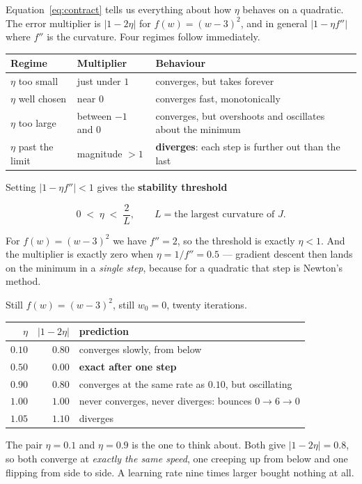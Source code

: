 \documentclass[11pt]{article}
\begin{document}
Equation~\eqref{eq:contract} tells us everything about how $\eta$ behaves on a
quadratic. The error multiplier is $\lvert 1 - 2\eta\rvert$ for
$f(w) = (w-3)^2$, and in general $\lvert 1 - \eta f''\rvert$ where $f''$ is the
curvature. Four regimes follow immediately.

\begin{center}
\begin{tabular}{@{}llp{7.6cm}@{}}
\toprule
\textbf{Regime} & \textbf{Multiplier} & \textbf{Behaviour}\\
\midrule
$\eta$ too small     & just under $1$ & converges, but takes forever\\[3pt]
$\eta$ well chosen   & near $0$       & converges fast, monotonically\\[3pt]
$\eta$ too large     & between $-1$ and $0$ & converges, but overshoots and
  oscillates about the minimum\\[3pt]
$\eta$ past the limit & magnitude $> 1$ & \textbf{diverges}: each step is
  further out than the last\\
\bottomrule
\end{tabular}
\end{center}

Setting $\lvert 1 - \eta f''\rvert < 1$ gives the \textbf{stability threshold}

\begin{equation}
  \label{eq:stab}
  0 \;<\; \eta \;<\; \frac{2}{L},
  \qquad L = \text{the largest curvature of } J .
\end{equation}

For $f(w) = (w-3)^2$ we have $f'' = 2$, so the threshold is exactly
$\eta < 1$. And the multiplier is exactly zero when $\eta = 1/f'' = 0.5$ ---
gradient descent then lands on the minimum in a \emph{single step}, because for
a quadratic that step is Newton's method.

\begin{worked}
Still $f(w) = (w-3)^2$, still $w_0 = 0$, twenty iterations.

\begin{center}
\begin{tabular}{@{}rrl@{}}
\toprule
$\eta$ & $\lvert 1-2\eta \rvert$ & prediction\\
\midrule
$0.10$ & $0.80$ & converges slowly, from below\\
$0.50$ & $0.00$ & \textbf{exact after one step}\\
$0.90$ & $0.80$ & converges at the same rate as $0.10$, but oscillating\\
$1.00$ & $1.00$ & never converges, never diverges: bounces $0 \to 6 \to 0$\\
$1.05$ & $1.10$ & diverges\\
\bottomrule
\end{tabular}
\end{center}

The pair $\eta = 0.1$ and $\eta = 0.9$ is the one to think about. Both give
$\lvert 1-2\eta\rvert = 0.8$, so both converge at \emph{exactly the same speed},
one creeping up from below and one flipping from side to side. A learning rate
nine times larger bought nothing at all.
\end{worked}
\end{document}
